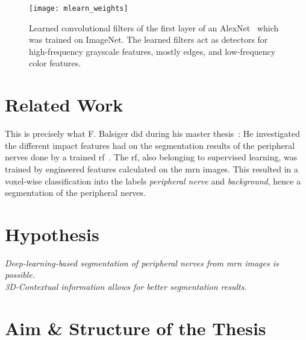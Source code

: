 \begin{figure}[htbp]
    \centering
	\texttt{[image: mlearn\_weights]}
    \caption[Learned Weights of trained AlexNet]{Learned convolutional filters of the first layer of an AlexNet~\cite{Krizhevsky2012ImageNetNetworks} which was trained on ImageNet. The learned filters act as detectors for high-frequency grayscale features, mostly edges, and low-frequency color features.}
    \label{fig:mlearn_weights}
\end{figure}



\section{Related Work} %

This is precisely what F. Balsiger did during his master thesis~\cite{Balsiger2016DevelopmentApproaches}: He investigated the different impact features had on the segmentation results of the peripheral nerves done by a trained \gls{rf}~\cite{Breiman2001RandomForests}. The \gls{rf}, also belonging to supervised learning, was trained by engineered features calculated on the \gls{mrn} images. This resulted in a voxel-wise classification into the labels \textit{peripheral nerve} and \textit{background}, hence a segmentation of the peripheral nerves. \\

\section{Hypothesis} %

\textit{Deep-learning-based segmentation of peripheral nerves from \gls{mrn} images is possible.} \\
\textit{3D-Contextual information allows for better segmentation results.}

\section{Aim \& Structure of the Thesis} %

\endinput